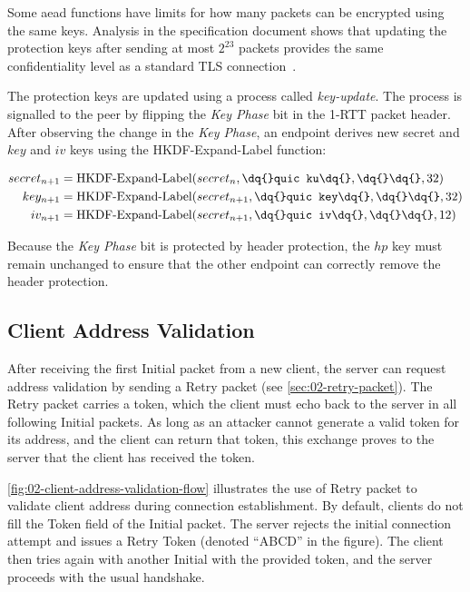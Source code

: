 Some \gls{aead} functions have limits for how many packets can be encrypted using the same keys.
Analysis in the specification document shows that updating the protection keys after sending at most
$2^{23}$ packets provides the same confidentiality level as a standard TLS
connection~\autocite[Appendix~B]{draft-ietf-quic-tls}.

The protection keys are updated using a process called \textit{\gls{key-update}}. The process is
signalled to the peer by flipping the \textit{Key Phase} bit in the 1-RTT packet header. After
observing the change in the \textit{Key Phase}, an endpoint derives new secret and $key$ and $iv$
keys using the HKDF-Expand-Label function:

\begin{equation*}
  \begin{split}
    secret_{n+1} & = \operatorname{HKDF-Expand-Label}(secret_{n}, \texttt{\dq{}quic ku\dq{}}, \texttt{\dq{}\dq{}}, 32) \\
    key_{n+1} & = \operatorname{HKDF-Expand-Label}(secret_{n+1}, \texttt{\dq{}quic key\dq{}}, \texttt{\dq{}\dq{}}, 32) \\
    iv_{n+1} & = \operatorname{HKDF-Expand-Label}(secret_{n+1}, \texttt{\dq{}quic iv\dq{}}, \texttt{\dq{}\dq{}}, 12) \\
  \end{split}
\end{equation*}

Because the \textit{Key Phase} bit is protected by header protection, the $hp$ key must remain
unchanged to ensure that the other endpoint can correctly remove the header protection.

\subsection{Client Address Validation}\label{sec:02-address-validation}

After receiving the first Initial packet from a new client, the server can request address
validation by sending a Retry packet (see \autoref{sec:02-retry-packet}). The Retry packet carries a
token, which the client must echo back to the server in all following Initial packets. As long as an
attacker cannot generate a valid token for its address, and the client can return that token, this
exchange proves to the server that the client has received the token.

\autoref{fig:02-client-address-validation-flow} illustrates the use of Retry packet to validate
client address during connection establishment. By default, clients do not fill the Token field of
the Initial packet. The server rejects the initial connection attempt and issues a Retry Token
(denoted ``ABCD'' in the figure). The client then tries again with another Initial with the provided
token, and the server proceeds with the usual handshake.

